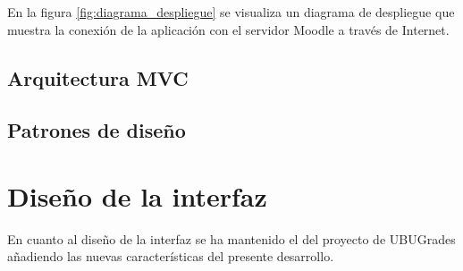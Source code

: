 En la figura \ref{fig:diagrama_despliegue} se visualiza un diagrama de despliegue que muestra la conexión de la aplicación con el servidor Moodle a través de Internet.



\subsection{Arquitectura MVC}

\subsection{Patrones de diseño}

\section{Diseño de la interfaz}
En cuanto al diseño de la interfaz se ha mantenido el del proyecto de UBUGrades añadiendo las nuevas características del presente desarrollo.